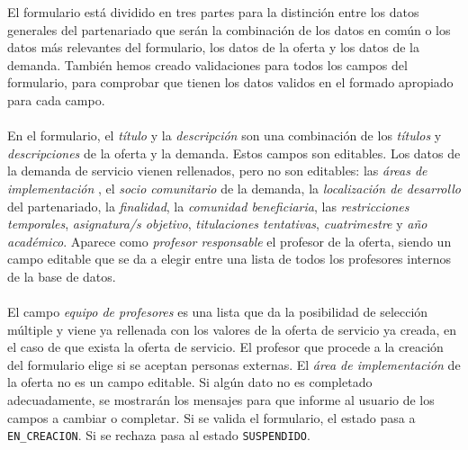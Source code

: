\documentclass[11pt]{book}
\begin{document}
El formulario está dividido en tres partes para la distinción entre los datos generales del partenariado que serán la combinación de los datos en común o los datos más relevantes del formulario, los datos de la oferta y los datos de la demanda. También hemos creado validaciones para todos los campos del formulario, para comprobar que tienen los datos validos en el formado apropiado para cada campo.\\\\
En el formulario, el \emph{título} y la \emph{descripción } son una combinación de los \emph{títulos} y \emph{descripciones} de la oferta y la demanda. Estos campos son editables. Los datos de la demanda de servicio vienen rellenados, pero no son editables:  las \emph{áreas de implementación} , el \emph{socio comunitario} de la demanda, la \emph{localización de desarrollo} del partenariado, la \emph{finalidad}, la \emph{comunidad beneficiaria}, las \emph{restricciones temporales}, \emph{asignatura/s objetivo}, \emph{titulaciones tentativas}, \emph{cuatrimestre} y \emph{año académico}. Aparece como \emph{profesor responsable} el profesor de la oferta, siendo un campo editable que se da a elegir entre una lista de todos los profesores internos de la base de datos.\\\\
El campo \emph{equipo de profesores} es una lista que da la posibilidad de selección múltiple y viene ya rellenada con los valores de la oferta de servicio ya creada, en el caso de que exista la oferta de servicio. El profesor que procede a la creación del formulario elige si se aceptan personas externas. El \emph{área de implementación} de la oferta no es un campo editable. Si algún dato no es completado adecuadamente, se mostrarán los mensajes para que informe al usuario de los campos a cambiar o completar. Si se valida el formulario, el estado pasa a \texttt{EN\_CREACION}. Si se rechaza pasa al estado \texttt{SUSPENDIDO}.
\\\\
\end{document}
